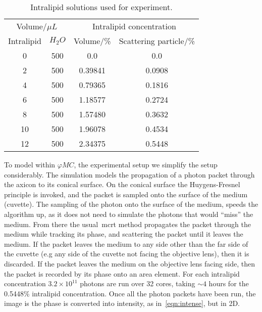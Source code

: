 \begin{table}[!ht]
\centering
    \begin{tabular}{cc|cc}
        \hline
        \multicolumn{2}{c|}{Volume/$\mu L$} & \multicolumn{2}{|c}{Intralipid concentration}                       \\
        Intralipid                & $H_2O$  & Volume/\%      & Scattering particle/\% \\ \hline
        \multicolumn{1}{c|}{0}    & 500     & \multicolumn{1}{c|}{0.0}       & 0.0                                    \\
        \multicolumn{1}{c|}{2}    & 500     & \multicolumn{1}{c|}{0.39841} & 0.0908                                \\
        \multicolumn{1}{c|}{4}    & 500     & \multicolumn{1}{c|}{0.79365} & 0.1816                                \\
        \multicolumn{1}{c|}{6}    & 500     & \multicolumn{1}{c|}{1.18577} & 0.2724                                \\
        \multicolumn{1}{c|}{8}    & 500     & \multicolumn{1}{c|}{1.57480} & 0.3632                                \\
        \multicolumn{1}{c|}{10}   & 500     & \multicolumn{1}{c|}{1.96078} & 0.4534                                \\
        \multicolumn{1}{c|}{12}   & 500     & \multicolumn{1}{c|}{2.34375} & 0.5448                                \\ \hline
    \end{tabular}
    \caption{Intralipid solutions used for experiment.}
    \label{tab:intra}
\end{table}


To model within $\varphi MC$, the experimental setup we simplify the setup considerably.
The simulation models the propagation of a photon packet through the axicon to its conical surface. 
On the conical surface the Huygens-Fresnel principle is invoked, and the packet is sampled onto the surface of the medium (cuvette).
The sampling of the photon onto the surface of the medium, speeds the algorithm up, as it does not need to simulate the photons that would ``miss'' the medium.
From there the usual~\gls*{mcrt} method propagates the packet through the medium while tracking its phase, and scattering the packet until it leaves the medium.
If the packet leaves the medium to any side other than the far side of the cuvette (e.g any side of the cuvette not facing the objective lens), then it is discarded.
If the packet leaves the medium on the objective lens facing side, then the packet is recorded by its phase onto an area element.
For each intralipid concentration $3.2\times10^{11}$ photons are run over 32 cores, taking $\sim 4$ hours for the 0.5448\% intralipid concentration.
Once all the photon packets have been run, the image is the phase is converted into intensity, as in~\cref{eqn:intense}, but in 2D.

